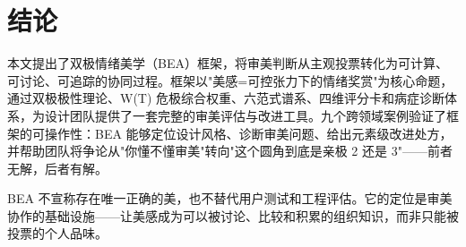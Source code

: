 \documentclass[10pt,a4paper]{article}
\begin{document}
\section{结论}

本文提出了双极情绪美学（BEA）框架，将审美判断从主观投票转化为可计算、可讨论、可追踪的协同过程。框架以"美感=可控张力下的情绪奖赏"为核心命题，通过双极极性理论、W(T) 危极综合权重、六范式谱系、四维评分卡和病症诊断体系，为设计团队提供了一套完整的审美评估与改进工具。九个跨领域案例验证了框架的可操作性：BEA 能够定位设计风格、诊断审美问题、给出元素级改进处方，并帮助团队将争论从"你懂不懂审美"转向"这个圆角到底是亲极 2 还是 3"——前者无解，后者有解。

BEA 不宣称存在唯一正确的美，也不替代用户测试和工程评估。它的定位是审美协作的基础设施——让美感成为可以被讨论、比较和积累的组织知识，而非只能被投票的个人品味。
\end{document}
